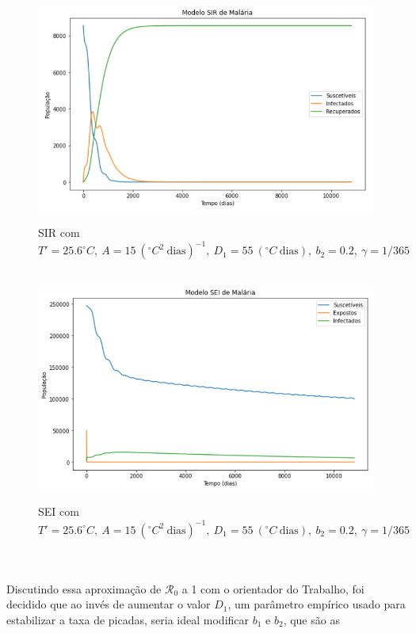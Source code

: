 \documentclass[12pt]{article}
\begin{document}
\begin{figure}[!ht]
        \centering
        \hbox{\hspace{3.5em} \includegraphics[scale=0.6] {SIR_R0_near1.png}}
        \caption{SIR com $T'=25.6 ^\circ C, \ A=15 \ (^\circ C^2 \ \text{dias})^{-1}, \ D_1=55 \ (^\circ C \ \text{dias}), \ b_2=0.2, \ \gamma=1/365$}
\end{figure} 
\begin{figure}[!ht]
        \centering
        \hbox{\hspace{3.5em} \includegraphics[scale=0.6] {SEI_R0_near1.png}}
        \caption{SEI com $T'=25.6 ^\circ C, \ A=15 \ (^\circ C^2 \ \text{dias})^{-1}, \ D_1=55 \ (^\circ C \ \text{dias}), \ b_2=0.2, \ \gamma=1/365$}
\end{figure}
\\\\
Discutindo essa aproximação de $\mathcal{R}_0$ a 1 com o orientador do 
Trabalho, foi decidido 
que ao invés de aumentar o valor $D_1$, um parâmetro empírico usado para 
estabilizar a taxa de picadas, seria ideal modificar $b_1$ e $b_2$, que são as
\end{document}
